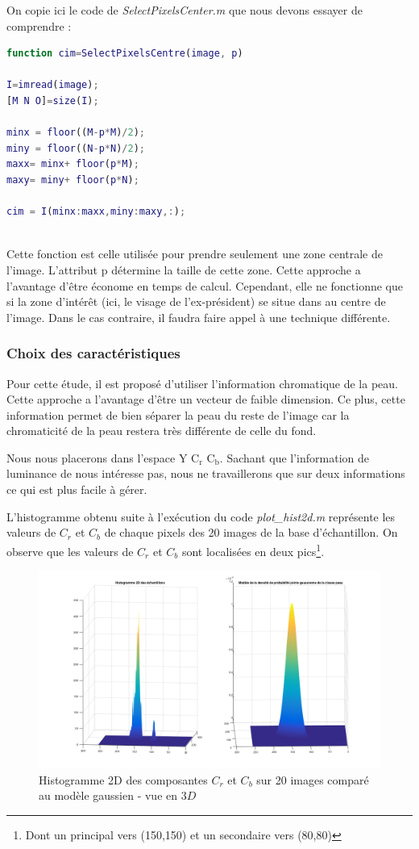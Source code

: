 \documentclass[11pt,a4paper]{article}
\begin{document}
On copie ici le code de \emph{SelectPixelsCenter.m} que nous devons essayer de comprendre :
 
\noindent\hrulefill
\begin{lstlisting}[language=matlab]
function cim=SelectPixelsCentre(image, p)

I=imread(image);
[M N O]=size(I);

minx = floor((M-p*M)/2);
miny = floor((N-p*N)/2);
maxx= minx+ floor(p*M);
maxy= miny+ floor(p*N);

cim = I(minx:maxx,miny:maxy,:);
\end{lstlisting}
\noindent\hrulefill
\\
Cette fonction est celle utilisée pour prendre seulement une zone centrale de l'image. L'attribut p détermine la taille de cette zone.
Cette approche a l'avantage d'être économe en temps de calcul. Cependant, elle ne fonctionne que si la zone d'intérêt (ici, le visage de l'ex-président) se situe dans au centre de l'image. Dans le cas contraire, il faudra faire appel à une technique différente.

\subsubsection{Choix des caractéristiques}
Pour cette étude, il est proposé d'utiliser l'information chromatique de la peau. Cette approche a l'avantage d'être un vecteur de faible dimension. Ce plus, cette information permet de bien séparer la peau du reste de l'image car la chromaticité de la peau restera très différente de celle du fond.

Nous nous placerons dans l'espace Y C$_\text{r}$ C$_\text{b}$. Sachant que l'information de luminance de nous intéresse pas, nous ne travaillerons que sur deux informations ce qui est plus facile à gérer.

L'histogramme obtenu suite à l'exécution du code \emph{plot\_hist2d.m} représente les valeurs de $C_r$ et $C_b$ de chaque pixels des 20 images de la base d'échantillon. On observe que les valeurs de $C_r$ et $C_b$ sont localisées en deux pics\footnote{Dont un principal vers (150,150) et un secondaire vers (80,80)}.

\begin{figure}[H]
\center
\includegraphics[width=15cm]{exo2_hist2D.png}
\caption{Histogramme 2D des composantes $C_r$ et $C_b$ sur 20 images comparé au modèle gaussien - vue en $3D$}
\label{fig.exo2_histogramme2D}
\end{figure} 
\end{document}
